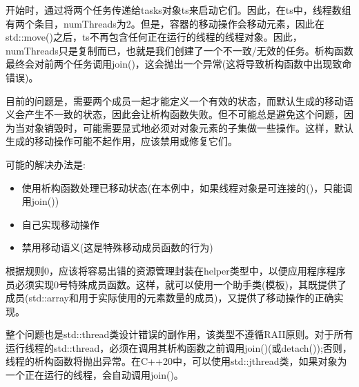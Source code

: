开始时，通过将两个任务传递给tasks对象ts来启动它们。因此，在ts中，线程数组有两个条目，numThreads为2。但是，容器的移动操作会移动元素，因此在std::move()之后，ts不再包含任何正在运行的线程的线程对象。因此，numThreads只是复制而已，也就是我们创建了一个不一致/无效的任务。析构函数最终会对前两个任务调用join()，这会抛出一个异常(这将导致析构函数中出现致命错误)。\par

目前的问题是，需要两个成员一起才能定义一个有效的状态，而默认生成的移动语义会产生不一致的状态，因此会让析构函数失败。但不可能总是避免这个问题，因为当对象销毁时，可能需要显式地必须对对象元素的子集做一些操作。这样，默认生成的移动操作可能不起作用，应该禁用或修复它们。\par

可能的解决办法是:\par

\begin{itemize}
	\item 使用析构函数处理已移动状态(在本例中，如果线程对象是可连接的()，只能调用join())
	\item 自己实现移动操作
	\item 禁用移动语义(这是特殊移动成员函数的行为)
\end{itemize}

根据规则0，应该将容易出错的资源管理封装在helper类型中，以便应用程序程序员必须实现0号特殊成员函数。这样，就可以使用一个助手类(模板)，其既提供了成员(std::array和用于实际使用的元素数量的成员)，又提供了移动操作的正确实现。\par

整个问题也是std::thread类设计错误的副作用，该类型不遵循RAII原则。对于所有运行线程的std::thread，必须在调用其析构函数之前调用join()(或detach());否则，线程的析构函数将抛出异常。在C++20中，可以使用std::jthread类，如果对象为一个正在运行的线程，会自动调用join()。\par




















